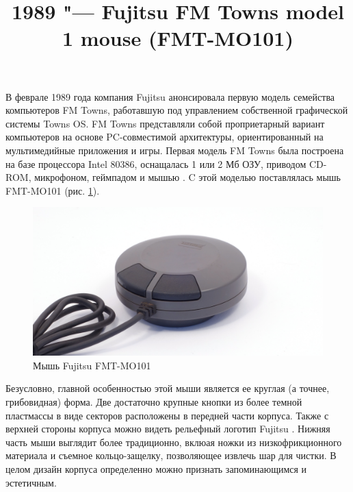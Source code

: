 \documentclass[11pt, a4paper]{article}
\begin{document}
\title{1989 "--- Fujitsu FM Towns model 1 mouse (FMT-MO101)}
\date{}
\maketitle
{}

В феврале 1989 года компания Fujitsu анонсировала первую модель семейства компьютеров FM Towns, работавшую под управлением собственной графической системы Towns OS. FM Towns представляли собой проприетарный вариант компьютеров на основе PC-совместимой архитектуры, ориентированный на мультимедийные приложения и игры. Первая модель FM Towns была построена на базе процессора Intel 80386, оснащалась 1 или 2 Мб ОЗУ, приводом CD-ROM, микрофоном, геймпадом и мышью \cite{wikipedia}. C этой моделью поставлялась мышь FMT-MO101 (рис. \ref{fig:FMT1Pic}).

\begin{figure}[h]
    \centering
    \includegraphics[scale=0.6]{1989_fujitsu_fmt_mo101_mouse/pic_30.jpg}
    \caption{Мышь Fujitsu FMT-MO101}
    \label{fig:FMT1Pic}
\end{figure}

Безусловно, главной особенностью этой мыши является ее круглая (а точнее, грибовидная) форма. Две достаточно крупные кнопки из более темной пластмассы в виде секторов расположены в передней части корпуса. Также с верхней стороны корпуса можно видеть рельефный логотип Fujitsu \cite{twinklemagic}. Нижняя часть мыши выглядит более традиционно, вклюая ножки из низкофрикционного материала и съемное кольцо-защелку, позволяющее извлечь шар для чистки. В целом дизайн корпуса определенно можно признать запоминающимся и эстетичным.
\end{document}
